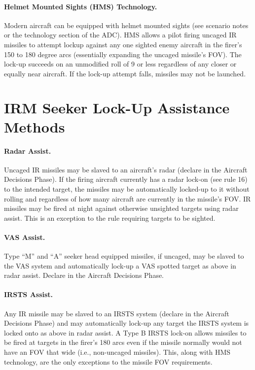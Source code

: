 \begin{advancedrules}
{\paragraph{Helmet Mounted Sights (HMS) Technology.} Modern aircraft can be equipped with helmet mounted sights (see scenario notes or the technology section of the ADC). HMS allows a pilot firing uncaged IR missiles to attempt lock­up against any one sighted enemy aircraft in the firer's 150 to 180 degree arcs (essentially expanding the uncaged missile's FOV). The lock-up succeeds on an unmodified roll of 9 or less regardless of any closer or equally near aircraft. If the lock-up attempt falls, missiles may not be launched.

\section{IRM Seeker Lock-Up Assistance Methods}
\label{rule:irm-seeker-lock-up-assistance-methods}
\label{rule:irm-radar}
\label{rule:irm-vas}
\label{rule:irm-irsts}

\paragraph{Radar Assist.} Uncaged IR missiles may be slaved to an aircraft's radar (declare in the Aircraft Decisions Phase). If the firing aircraft currently has a radar lock-on (see rule 16) to the intended target, the missiles may be automatically locked-up to it without rolling and regardless of how many aircraft are currently in the missile's FOV. IR missiles may be fired at night against otherwise unsighted targets using radar assist. This is an exception to the rule requiring targets to be sighted.

\paragraph{VAS Assist.} Type “M” and “A” seeker head equipped missiles, if uncaged, may be slaved to the VAS system and automatically lock-up a VAS spotted target as above in radar assist. Declare in the Aircraft Decisions Phase.

\paragraph{IRSTS Assist.} Any IR missile may be slaved to an IRSTS system (declare in the Aircraft Decisions Phase) and may automatically lock-up any target the IRSTS system is locked onto as above in radar assist. A Type B IRSTS lock-on allows missiles to be fired at targets in the firer's 180 arcs even if the missile normally would not have an FOV that wide (i.e., non-uncaged missiles). This, along with HMS technology, are the only exceptions to the missile FOV requirements.
}{
}
\end{advancedrules}
